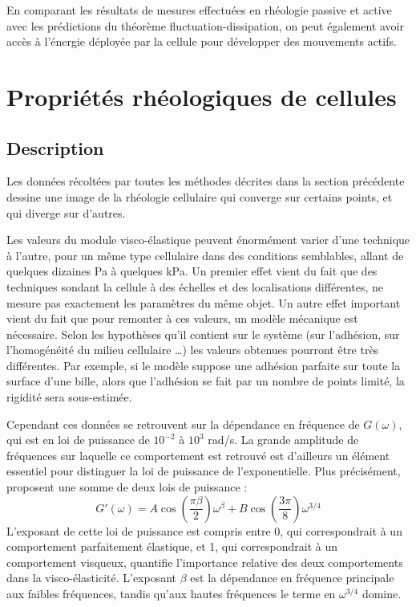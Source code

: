 En comparant les résultats de mesures effectuées en rhéologie passive et active avec les prédictions du théorème fluctuation-dissipation, on peut également avoir accès à l'énergie déployée par la cellule pour développer des mouvements actifs. 



\section{Propriétés rhéologiques de cellules}

\subsection{Description}

Les données récoltées par toutes les méthodes décrites dans la section précédente dessine une image de la rhéologie cellulaire qui converge sur certains points, et qui diverge sur d'autres. 

Les valeurs du module visco-élastique peuvent énormément varier d'une technique à l'autre, pour un même type cellulaire dans des conditions semblables, allant de quelques dizaines Pa à quelques kPa. 
Un premier effet vient du fait que des techniques sondant la cellule à des échelles et des localisations différentes, ne mesure pas exactement les paramètres du même objet. 
Un autre effet important vient du fait que pour remonter à ces valeurs, un modèle mécanique est nécessaire. Selon les hypothèses qu'il contient sur le système (sur l'adhésion, sur l'homogénéité du milieu cellulaire \dots) les valeurs obtenues pourront être très différentes. 
Par exemple, si le modèle suppose une adhésion parfaite sur toute la surface d'une bille, alors que l'adhésion se fait par un nombre de points limité, la rigidité sera sous-estimée. 

Cependant ces données se retrouvent sur la dépendance en fréquence de $G(\omega)$, qui est en loi de puissance de $10^{-2}$ à $10^3$ rad/s. La grande amplitude de fréquences sur laquelle ce comportement est retrouvé est d'ailleurs un élément essentiel pour distinguer la loi de puissance de l'exponentielle. Plus précisément, \cite{hoffner} proposent une somme de deux lois de puissance : 
$$G'(\omega)= A \cos \left(\frac{\pi \beta}{2}\right) \omega^{\beta} + B \cos\left(\frac{3 \pi}{8}\right) \omega^{3/4}$$
L'exposant de cette loi de puissance est compris entre 0, qui correspondrait à un comportement parfaitement élastique, et 1, qui correspondrait à un comportement visqueux, quantifie l'importance relative des deux comportements dans la visco-élasticité. 
L'exposant $\beta$ est la dépendance en fréquence principale aux faibles fréquences, tandis qu'aux hautes fréquences le terme en $\omega^{3/4}$ domine. 

